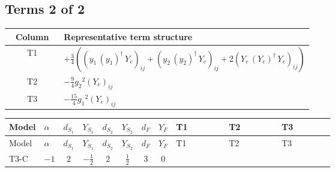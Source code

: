 \documentclass[8pt]{article}
\begin{document}
\begin{landscape}
\subsection*{Terms 2 of 2}
\begin{center}
\begin{tabular}{@{}c >{\raggedright\arraybackslash}p{0.82\linewidth}@{}}
\toprule
Column & Representative term structure \\
\midrule
T1 & \(\displaystyle +\frac{3}{4} (\left({y_1}\,\left({y_1}\right)^{\dagger}\,{Y_e}\right)_{ij}+\left({y_2}\,\left({y_2}\right)^{\dagger}\,{Y_e}\right)_{ij}+2 \left({Y_e}\,\left({Y_e}\right)^{\dagger}\,{Y_e}\right)_{ij})\) \\
\midrule
T2 & \(\displaystyle -\frac{9}{4} {g_2}^2 \left({Y_e}\right)_{ij}\) \\
\midrule
T3 & \(\displaystyle -\frac{15}{4} {g_1}^2 \left({Y_e}\right)_{ij}\) \\
\midrule
\bottomrule
\end{tabular}
\end{center}
\smallskip
\tiny
\begin{longtable}{@{}llcccccc >{\raggedright\arraybackslash}p{0.21\linewidth} >{\raggedright\arraybackslash}p{0.21\linewidth} >{\raggedright\arraybackslash}p{0.21\linewidth}@{}}
\toprule
Model & $\alpha$ & $d_{S_1}$ & $Y_{S_1}$ & $d_{S_2}$ & $Y_{S_2}$ & $d_F$ & $Y_F$ & T1 & T2 & T3 \\
\midrule
\endfirsthead
\toprule
Model & $\alpha$ & $d_{S_1}$ & $Y_{S_1}$ & $d_{S_2}$ & $Y_{S_2}$ & $d_F$ & $Y_F$ & T1 & T2 & T3 \\
\midrule
\endhead
T3-C & $-1$ & $2$ & $-\frac{1}{2}$ & $2$ & $\frac{1}{2}$ & $3$ & $0$ & \scriptsize\adjustbox{max width=\linewidth}{$\begin{gathered} +\frac{3}{4} (\left({y_1}\,\left({y_1}\right)^{\dagger}\,{Y_e}\right)_{ij}+\left({y_2}\,\left({y_2}\right)^{\dagger}\,{Y_e}\right)_{ij}+2 \left({Y_e}\,\left({Y_e}\right)^{\dagger}\,{Y_e}\right)_{ij})\end{gathered}$} & \scriptsize\adjustbox{max width=\linewidth}{$\begin{gathered} -\frac{9}{4} {g_2}^2 \left({Y_e}\right)_{ij}\end{gathered}$} & \scriptsize\adjustbox{max width=\linewidth}{$\begin{gathered} -\frac{15}{4} {g_1}^2 \left({Y_e}\right)_{ij}\end{gathered}$} \\
\midrule
\bottomrule
\end{longtable}
\clearpage

\end{landscape}
\end{document}
